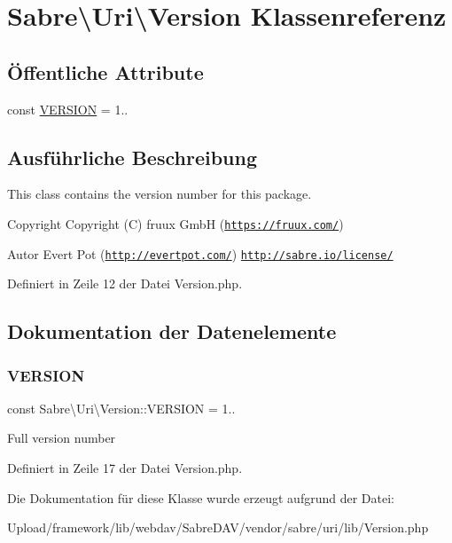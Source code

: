 \hypertarget{class_sabre_1_1_uri_1_1_version}{}\section{Sabre\textbackslash{}Uri\textbackslash{}Version Klassenreferenz}
\label{class_sabre_1_1_uri_1_1_version}
\subsection*{Öffentliche Attribute}
\begin{DoxyCompactItemize}
\item 
const \mbox{\hyperlink{class_sabre_1_1_uri_1_1_version_a89376f5c51379740cc41bbec6375f8c1}{V\+E\+R\+S\+I\+ON}} = \textquotesingle{}1..\textquotesingle{}
\end{DoxyCompactItemize}


\subsection{Ausführliche Beschreibung}
This class contains the version number for this package.

\begin{DoxyCopyright}{Copyright}
Copyright (C) fruux GmbH (\href{https://fruux.com/}{\tt https\+://fruux.\+com/}) 
\end{DoxyCopyright}
\begin{DoxyAuthor}{Autor}
Evert Pot (\href{http://evertpot.com/}{\tt http\+://evertpot.\+com/})  \href{http://sabre.io/license/}{\tt http\+://sabre.\+io/license/} 
\end{DoxyAuthor}


Definiert in Zeile 12 der Datei Version.\+php.



\subsection{Dokumentation der Datenelemente}
\mbox{\label{class_sabre_1_1_uri_1_1_version_a89376f5c51379740cc41bbec6375f8c1}} 
\subsubsection{\texorpdfstring{V\+E\+R\+S\+I\+ON}{VERSION}}
{\footnotesize\ttfamily const Sabre\textbackslash{}\+Uri\textbackslash{}\+Version\+::\+V\+E\+R\+S\+I\+ON = \textquotesingle{}1..\textquotesingle{}}

Full version number 

Definiert in Zeile 17 der Datei Version.\+php.



Die Dokumentation für diese Klasse wurde erzeugt aufgrund der Datei\+:\begin{DoxyCompactItemize}
\item 
Upload/framework/lib/webdav/\+Sabre\+D\+A\+V/vendor/sabre/uri/lib/Version.\+php\end{DoxyCompactItemize}
